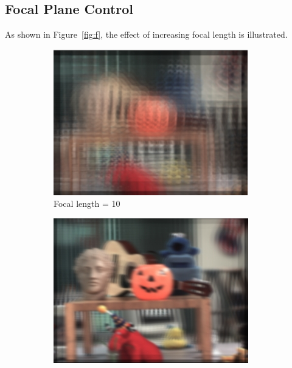 \documentclass{article}
\begin{document}
\subsection{Focal Plane Control}

As shown in Figure~\ref{fig:f}, the effect of increasing focal length is illustrated.
\begin{figure}[htbp]
    \centering
    \begin{subfigure}[b]{0.32\textwidth} %
        \centering
        \includegraphics[width=\textwidth]{f1.png} %
        \caption{Focal length = 10} %
    \end{subfigure}
    \hfill
    \begin{subfigure}[b]{0.32\textwidth} %
        \centering
        \includegraphics[width=\textwidth]{f12.png} %

\end{subfigure}
\end{figure}
\end{document}
